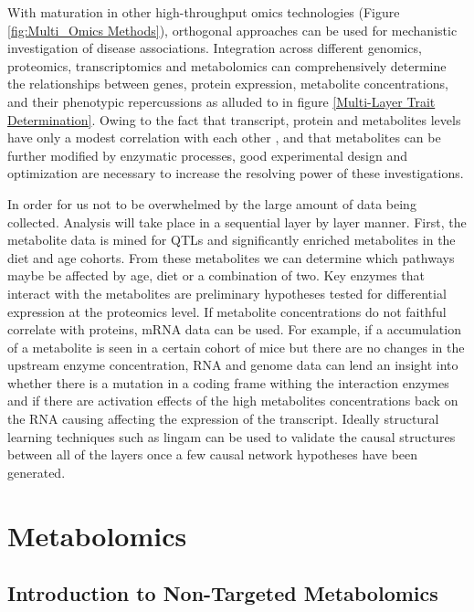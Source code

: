 \documentclass[a4paper]{book}
\begin{document}
	With maturation in other high-throughput omics technologies (Figure \ref{fig:Multi_Omics Methods}), orthogonal approaches can be used for mechanistic investigation of disease associations. Integration across different genomics, proteomics, transcriptomics and metabolomics can comprehensively determine the relationships between genes, protein expression, metabolite concentrations, and their phenotypic repercussions as alluded to in figure \ref{Multi-Layer Trait Determination}. Owing to the fact that transcript, protein and metabolites levels have only a modest correlation with each other \citep{Williams2016SystemsFunction}, and that metabolites can be further modified by enzymatic processes, good experimental design and optimization are necessary to increase the resolving power of these investigations. 
	
	In order for us not to be overwhelmed by the large amount of data being collected. Analysis will take place in a sequential layer by layer manner. First, the metabolite data is mined for QTLs and significantly enriched metabolites in the diet and age cohorts. From these metabolites we can determine which pathways maybe be affected by age, diet or a combination of two. Key enzymes that interact with the metabolites are preliminary hypotheses tested for differential expression at the proteomics level. If metabolite concentrations do not faithful correlate with proteins, mRNA data can be used. For example, if a accumulation of a metabolite is seen in a certain cohort of mice but there are no changes in the upstream enzyme concentration, RNA and genome data can lend an insight into whether there is a mutation in a coding frame withing the interaction enzymes and if there are activation effects of the high metabolites concentrations back on the RNA causing affecting the expression of the transcript. Ideally structural learning techniques such as lingam\citep{ShimizuLiNGAM:Structures} can be used to validate the causal structures between all of the layers once a few causal network hypotheses have been generated.
	
	\chapter{Metabolomics}
	
	\section{Introduction to Non-Targeted Metabolomics}
	
\end{document}
